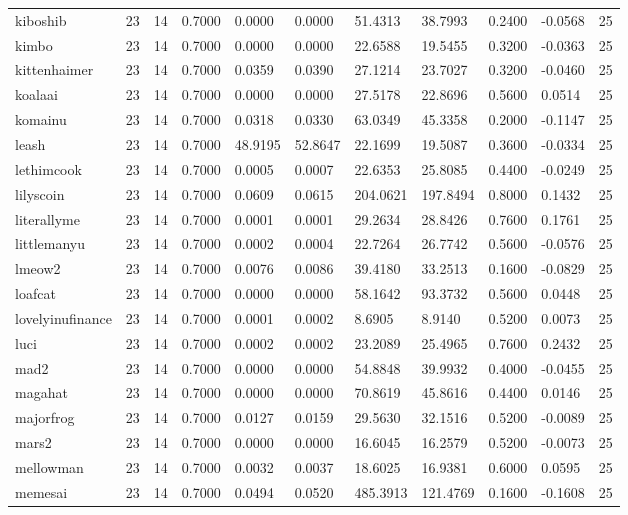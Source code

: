 \begin{table}[htbp]
\begin{tabular}{lllllllllll}
kiboshib & 23 & 14 & 0.7000 & 0.0000 & 0.0000 & 51.4313 & 38.7993 & 0.2400 & -0.0568 & 25 \\
kimbo & 23 & 14 & 0.7000 & 0.0000 & 0.0000 & 22.6588 & 19.5455 & 0.3200 & -0.0363 & 25 \\
kittenhaimer & 23 & 14 & 0.7000 & 0.0359 & 0.0390 & 27.1214 & 23.7027 & 0.3200 & -0.0460 & 25 \\
koalaai & 23 & 14 & 0.7000 & 0.0000 & 0.0000 & 27.5178 & 22.8696 & 0.5600 & 0.0514 & 25 \\
komainu & 23 & 14 & 0.7000 & 0.0318 & 0.0330 & 63.0349 & 45.3358 & 0.2000 & -0.1147 & 25 \\
leash & 23 & 14 & 0.7000 & 48.9195 & 52.8647 & 22.1699 & 19.5087 & 0.3600 & -0.0334 & 25 \\
lethimcook & 23 & 14 & 0.7000 & 0.0005 & 0.0007 & 22.6353 & 25.8085 & 0.4400 & -0.0249 & 25 \\
lilyscoin & 23 & 14 & 0.7000 & 0.0609 & 0.0615 & 204.0621 & 197.8494 & 0.8000 & 0.1432 & 25 \\
literallyme & 23 & 14 & 0.7000 & 0.0001 & 0.0001 & 29.2634 & 28.8426 & 0.7600 & 0.1761 & 25 \\
littlemanyu & 23 & 14 & 0.7000 & 0.0002 & 0.0004 & 22.7264 & 26.7742 & 0.5600 & -0.0576 & 25 \\
lmeow2 & 23 & 14 & 0.7000 & 0.0076 & 0.0086 & 39.4180 & 33.2513 & 0.1600 & -0.0829 & 25 \\
loafcat & 23 & 14 & 0.7000 & 0.0000 & 0.0000 & 58.1642 & 93.3732 & 0.5600 & 0.0448 & 25 \\
lovelyinufinance & 23 & 14 & 0.7000 & 0.0001 & 0.0002 & 8.6905 & 8.9140 & 0.5200 & 0.0073 & 25 \\
luci & 23 & 14 & 0.7000 & 0.0002 & 0.0002 & 23.2089 & 25.4965 & 0.7600 & 0.2432 & 25 \\
mad2 & 23 & 14 & 0.7000 & 0.0000 & 0.0000 & 54.8848 & 39.9932 & 0.4000 & -0.0455 & 25 \\
magahat & 23 & 14 & 0.7000 & 0.0000 & 0.0000 & 70.8619 & 45.8616 & 0.4400 & 0.0146 & 25 \\
majorfrog & 23 & 14 & 0.7000 & 0.0127 & 0.0159 & 29.5630 & 32.1516 & 0.5200 & -0.0089 & 25 \\
mars2 & 23 & 14 & 0.7000 & 0.0000 & 0.0000 & 16.6045 & 16.2579 & 0.5200 & -0.0073 & 25 \\
mellowman & 23 & 14 & 0.7000 & 0.0032 & 0.0037 & 18.6025 & 16.9381 & 0.6000 & 0.0595 & 25 \\
memesai & 23 & 14 & 0.7000 & 0.0494 & 0.0520 & 485.3913 & 121.4769 & 0.1600 & -0.1608 & 25 \\

\end{tabular}
\end{table}
